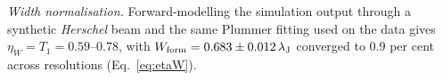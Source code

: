 \documentclass[usenatbib,twoside,twocolumn]{mnras}
\begin{document}
\emph{Width normalisation.} Forward-modelling the simulation output through a synthetic \textit{Herschel} beam and the same Plummer fitting used on the data gives $\eta_W=T_1=0.59$--$0.78$, with $W_{\rm form}=0.683\pm0.012\,\lambda_{\rm J}$ converged to $0.9$ per cent across resolutions (Eq.~\ref{eq:etaW}).




\bsp
\label{lastpage}
\end{document}
